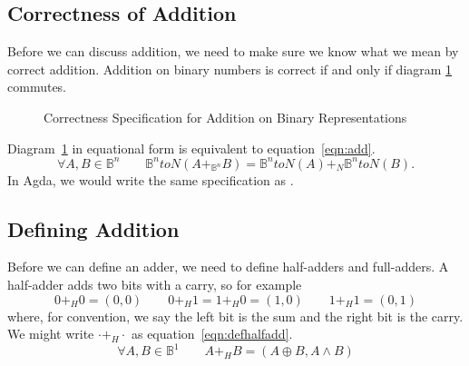 \documentclass[14pt]{extarticle}  %
\begin{document}
\subsection{Correctness of Addition}
Before we can discuss addition, we need to make sure we know what we mean by correct addition. Addition on binary numbers is correct
if and only if diagram \ref{fig:add} commutes.
\begin{figure}
\centering
\caption{Correctness Specification for Addition on Binary Representations}
\label{fig:add}
\end{figure}
Diagram~\ref{fig:add} in equational form is equivalent to equation~\ref{eqn:add}.
\begin{equation}\label{eqn:add}
  \forall A , B \in \mathbb{B}^{n} \qquad \mathbb{B}^{n}toN(A+_{\mathbb{B}^{n}}B) = \mathbb{B}^{n}toN(A)+_{N}\mathbb{B}^{n}toN(B).
\end{equation}
In Agda, we would write the same specification as .
\subsection{Defining Addition}
Before we can define an adder, we need to define half-adders and full-adders.
A half-adder adds two bits with a carry, so for example
\[0 +_{H} 0 = (0,0) \qquad 0 +_{H} 1 = 1 +_{H} 0 = (1 , 0) \qquad 1 +_{H} 1 = (0 ,1 )\]
where, for convention, we say the left bit is the sum and the right bit is the carry.
We might write $\cdot +_{H}\cdot$ as equation~\ref{eqn:defhalfadd}.
\begin{equation}\label{eqn:defhalfadd}
  \forall A,B\in \mathbb{B}^{1} \qquad A +_{H} B = (A \oplus B , A \land B)
\end{equation}
\end{document}
